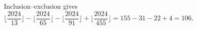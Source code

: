 Inclusion--exclusion gives $\lfloor \dfrac{2024}{13} \rfloor - \lfloor \dfrac{2024}{65} \rfloor - \lfloor \dfrac{2024}{91} \rfloor + \lfloor \dfrac{2024}{455} \rfloor = 155 - 31 - 22 + 4 = \boxed{106}$.

